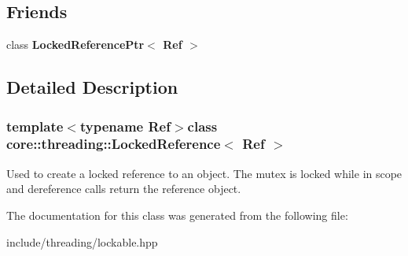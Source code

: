 \subsection*{Friends}
\begin{DoxyCompactItemize}
\item 
\hypertarget{classcore_1_1threading_1_1_locked_reference_a7d4652cd7d82323b07ea16332305e062}{class {\bfseries Locked\-Reference\-Ptr$<$ Ref $>$}}\label{classcore_1_1threading_1_1_locked_reference_a7d4652cd7d82323b07ea16332305e062}

\end{DoxyCompactItemize}


\subsection{Detailed Description}
\subsubsection*{template$<$typename Ref$>$class core\-::threading\-::\-Locked\-Reference$<$ Ref $>$}

Used to create a locked reference to an object. The mutex is locked while in scope and dereference calls return the reference object. 

The documentation for this class was generated from the following file\-:\begin{DoxyCompactItemize}
\item 
include/threading/lockable.\-hpp\end{DoxyCompactItemize}

